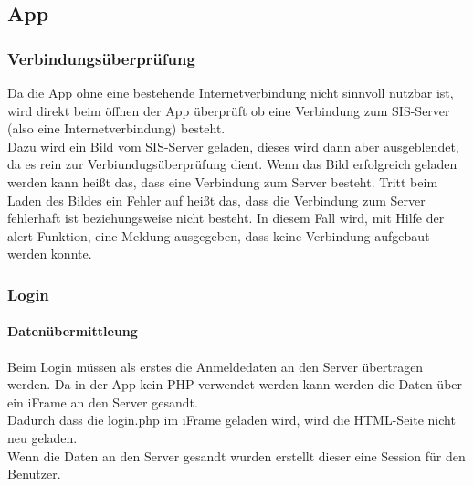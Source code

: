\subsection{App}

\subsubsection{Verbindungsüberprüfung}

Da die App ohne eine bestehende Internetverbindung nicht sinnvoll nutzbar ist, wird direkt beim öffnen der App überprüft ob eine Verbindung zum SIS-Server (also eine Internetverbindung) besteht.\\
Dazu wird ein Bild vom SIS-Server geladen, dieses wird dann aber ausgeblendet, da es rein zur Verbiundugsüberprüfung dient. Wenn das Bild erfolgreich geladen werden kann heißt das, dass eine Verbindung zum Server besteht. Tritt beim Laden des Bildes ein Fehler auf heißt das, dass die Verbindung zum Server fehlerhaft ist beziehungsweise nicht besteht. In diesem Fall wird, mit Hilfe der alert-Funktion, eine Meldung ausgegeben, dass keine Verbindung aufgebaut  werden konnte.\\



\subsubsection{Login}

\paragraph{Datenübermittleung\\}
Beim Login müssen als erstes die Anmeldedaten an den Server übertragen werden. Da in der App kein PHP verwendet werden kann werden die Daten über ein iFrame an den Server gesandt.\\



Dadurch dass die login.php im iFrame geladen wird, wird die HTML-Seite nicht neu geladen.\\
Wenn die Daten an den Server gesandt wurden erstellt dieser eine Session für den Benutzer.\\

